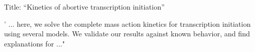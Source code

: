 Title: ``Kinetics of abortive transcription initiation''

' ... here, we solve the complete mass action kinetics for transcription
initiation using several models. We validate our results against known
behavior, and find explanations for ..."
